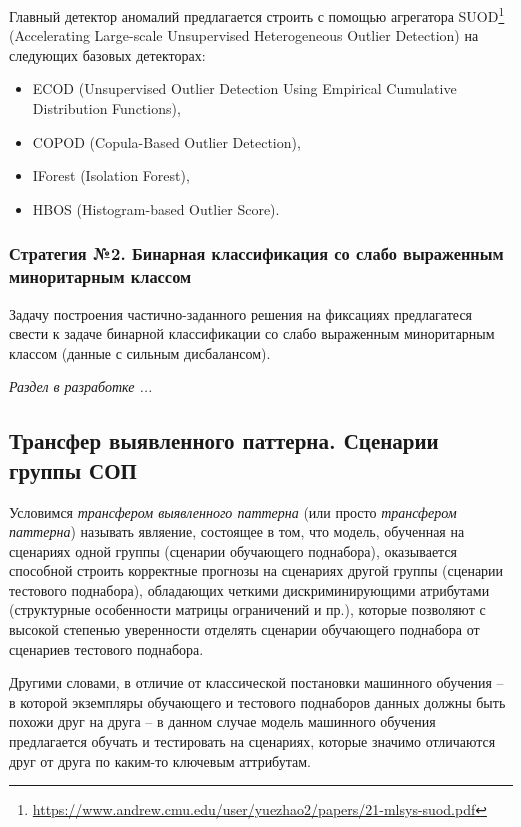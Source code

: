 \documentclass[%
	11pt,
	a4paper,
	utf8,
		]{article}
\begin{document}
Главный детектор аномалий предлагается строить с помощью агрегатора SUOD\footnote{\url{https://www.andrew.cmu.edu/user/yuezhao2/papers/21-mlsys-suod.pdf}} (Accelerating Large-scale Unsupervised Heterogeneous Outlier Detection) на следующих базовых детекторах:
\begin{itemize}
	\item ECOD (Unsupervised Outlier Detection Using Empirical Cumulative Distribution Functions),
	
	\item COPOD (Copula-Based Outlier Detection),
	
	\item IForest (Isolation Forest),
	
	\item HBOS (Histogram-based Outlier Score).
\end{itemize}



\subsubsection{Стратегия №2. Бинарная классификация со слабо выраженным миноритарным классом} Задачу построения частично-заданного решения на фиксациях предлагатеся свести к задаче бинарной классификации со слабо выраженным миноритарным классом (данные с сильным дисбалансом).

\emph{Раздел в разработке ...}

\subsection{Трансфер выявленного паттерна. Сценарии группы СОП}

Условимся \emph{трансфером выявленного паттерна} (или просто \emph{трансфером паттерна}) называть являение, состоящее в том, что модель, обученная на сценариях одной группы (сценарии обучающего поднабора), оказывается способной строить корректные прогнозы на сценариях другой группы (сценарии тестового поднабора), обладающих четкими дискриминирующими атрибутами (структурные особенности матрицы ограничений и пр.), которые позволяют с высокой степенью уверенности отделять сценарии обучающего поднабора от сценариев тестового поднабора.

Другими словами, в отличие от классической постановки машинного обучения -- в которой экземпляры обучающего и тестового поднаборов данных должны быть похожи друг на друга -- в данном случае модель машинного обучения предлагается обучать и тестировать на сценариях, которые значимо отличаются друг от друга по каким-то ключевым аттрибутам.
\end{document}
